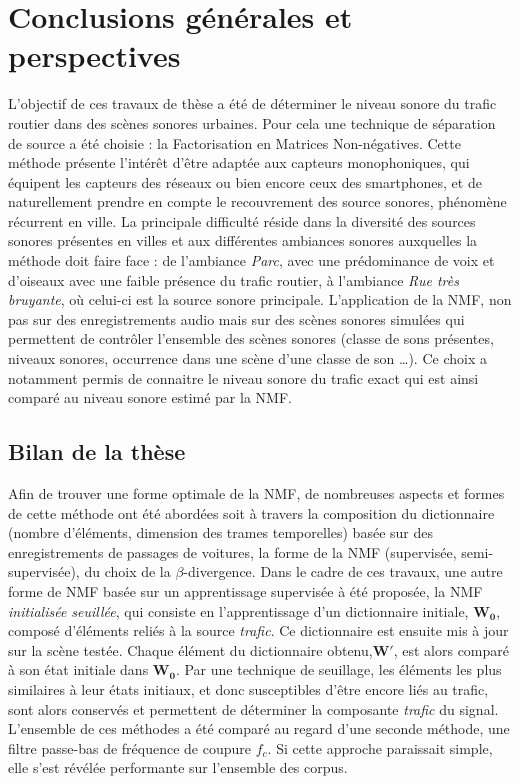 \chapter*{Conclusions générales et perspectives}
\label{chap:concl}



L'objectif de ces travaux de thèse a été de déterminer le niveau sonore du trafic routier dans des scènes sonores urbaines. Pour cela une technique de séparation de source a été choisie : la Factorisation en Matrices Non-négatives.
Cette méthode présente l'intérêt d'être adaptée aux capteurs monophoniques, qui équipent les capteurs des réseaux ou bien encore ceux des smartphones, et de naturellement prendre en compte le recouvrement des source sonores, phénomène récurrent en ville. 
La principale difficulté réside dans la diversité des sources sonores présentes en villes et aux différentes ambiances sonores auxquelles la méthode doit faire face : de l'ambiance \textit{Parc}, avec une prédominance de voix et d'oiseaux avec une faible présence du trafic routier, à l'ambiance \textit{Rue très bruyante}, où celui-ci est la source sonore principale.
L'application de la NMF, non pas sur des enregistrements audio mais sur des scènes sonores simulées qui permettent de contrôler l'ensemble des scènes sonores (classe de sons présentes, niveaux sonores, occurrence dans une scène d'une classe de son \dots). Ce choix a notamment permis  de connaitre le niveau sonore du trafic exact qui est ainsi comparé au niveau sonore estimé par la NMF. 

\section*{Bilan de la thèse}
Afin de trouver une forme optimale de la NMF, de nombreuses aspects et formes de cette méthode ont été abordées soit  à travers la composition du dictionnaire (nombre d'éléments, dimension des trames temporelles) basée sur des enregistrements de passages de voitures, la forme de la NMF (supervisée, semi-supervisée), du choix de la $\beta$-divergence. Dans le cadre de ces travaux, une autre forme de NMF basée sur un apprentissage supervisée à été proposée, la NMF \textit{initialisée seuillée}, qui consiste en l'apprentissage d'un dictionnaire initiale, $\mathbf{W_0}$, composé d'éléments reliés à la source \textit{trafic}. Ce dictionnaire est ensuite mis à jour sur la scène testée. Chaque élément du dictionnaire obtenu,$\mathbf{W'}$, est alors comparé à son état initiale dans $\mathbf{W_0}$. Par une technique de seuillage, les éléments les plus similaires à leur états initiaux, et donc susceptibles d'être encore liés au trafic, sont alors conservés et permettent de déterminer la composante \textit{trafic} du signal.
L'ensemble de ces méthodes a été comparé au regard d'une seconde méthode, une filtre passe-bas de fréquence de coupure $f_c$. Si cette approche paraissait simple, elle s'est révélée performante sur l'ensemble des corpus.

